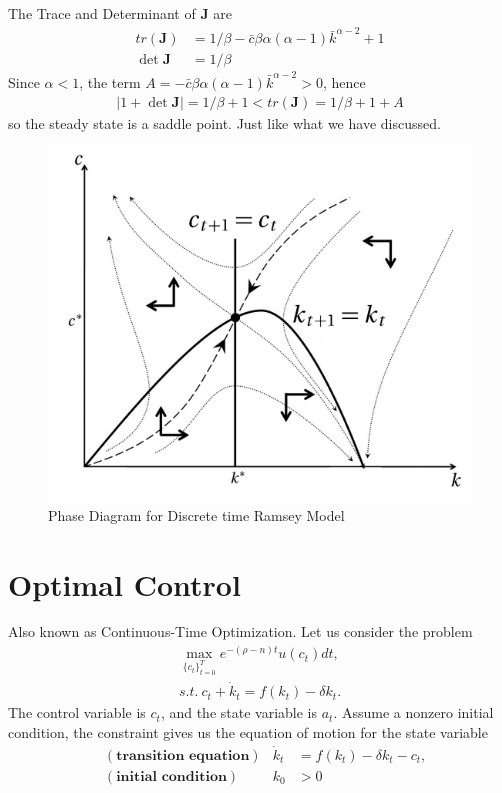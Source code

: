 \documentclass[11pt,a4paper]{book}
\theoremstyle{definition}\newtheorem{definition}{Definition}
\theoremstyle{definition}\newtheorem{fact}{Fact}
\theoremstyle{definition}\newtheorem{remark}{Remark}
\theoremstyle{definition}\newtheorem{ex}{Ex.}
\theoremstyle{definition}\newtheorem{project}{Project}
\theoremstyle{definition}\newtheorem{problem}{Problem}
\theoremstyle{definition}\newtheorem{example}{Example}
\numberwithin{theorem}{section}
\numberwithin{corollary}{chapter}
\numberwithin{assumption}{chapter}
\numberwithin{definition}{chapter}
\numberwithin{prop}{chapter}
\numberwithin{notation}{chapter}
\numberwithin{problem}{chapter}
\numberwithin{example}{chapter}
\numberwithin{fact}{chapter}
\numberwithin{ex}{chapter}
\def\J{\mathbf J}
\begin{document}
	The Trace and Determinant of $\J$ are
	\begin{align*}
		tr(\J) &= 1/\beta - \bar{c} \beta\alpha(\alpha-1)\bar{k}^{\alpha-2} + 1 \\
		\det \J &= 1/\beta
	\end{align*}
	Since $\alpha < 1$, the term $A = - \bar{c} \beta\alpha(\alpha-1)\bar{k}^{\alpha-2} > 0$, hence
	\begin{align*}
		|1 + \det \J | = 1/\beta + 1 < tr(\J) = 1/\beta + 1 + A
	\end{align*}
	so the steady state is a saddle point. Just like what we have discussed.
	
	\begin{figure}[ht]
		\centering
		\includegraphics[scale=0.5]{figs/discrete_ramsey.png}
		\caption{Phase Diagram for Discrete time Ramsey Model \citep{senouci2014endogenous}}
	\end{figure}
	
	\chapter{Optimal Control}
	Also known as Continuous-Time Optimization. Let us consider the problem
	\begin{align}
		\max_{ \{c_t\}^T_{t=0} } e^{-(\rho-n) t} u(c_t)  dt, \\
		s.t. \ c_t + \dot{k}_t = f(k_t) - \delta k_t.
	\end{align}
	The control variable is $c_t$, and the state variable is $a_t$. Assume a nonzero initial condition, the constraint gives us the equation of motion for the state variable
	\begin{align*}
		&(\textbf{transition equation}) & \dot{k}_t &= f(k_t) - \delta k_t - c_t, \\
		&(\textbf{initial condition}) & k_0 &> 0
	\end{align*}
\end{document}
